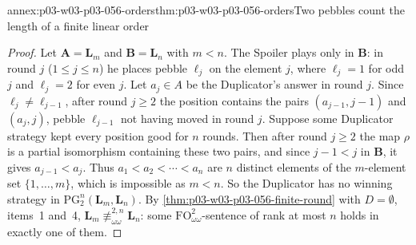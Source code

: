 \begin{annexitem}{annex:p03-w03-p03-056-orders}{thm:p03-w03-p03-056-orders}{Two pebbles count the length of a finite linear order}
\begin{proof}
Let \(\mathbf A=\mathbf L_m\) and \(\mathbf B=\mathbf L_n\) with \(m<n\). The
Spoiler plays only in \(\mathbf B\): in round \(j\) (\(1\leq j\leq n\)) he
places pebble \(\ell_j\) on the element \(j\), where \(\ell_j=1\) for odd
\(j\) and \(\ell_j=2\) for even \(j\). Let \(a_j\in A\) be the Duplicator's
answer in round \(j\). Since \(\ell_j\neq\ell_{j-1}\), after round
\(j\geq2\) the position contains the pairs \((a_{j-1},j-1)\) and
\((a_j,j)\), pebble \(\ell_{j-1}\) not having moved in round \(j\). Suppose
some Duplicator strategy kept every position good for \(n\) rounds. Then
after round \(j\geq2\) the map \(\rho\) is a partial isomorphism
containing these two pairs, and since \(j-1<j\) in \(\mathbf B\), it gives
\(a_{j-1}<a_j\). Thus \(a_1<a_2<\cdots<a_n\) are \(n\) distinct elements of
the \(m\)-element set \(\{1,\ldots,m\}\), which is impossible as \(m<n\). So
the Duplicator has no winning strategy in
\(\mathrm{PG}^n_2(\mathbf L_m,\mathbf L_n)\). By
\cref{thm:p03-w03-p03-056-finite-round} with \(D=\emptyset\), items~1 and~4,
\(\mathbf L_m\not\equiv^{2,n}_{\omega\omega}\mathbf L_n\): some
\(\mathrm{FO}^2_{\omega\omega}\)-sentence of rank at most \(n\) holds in
exactly one of them.
\end{proof}
\end{annexitem}

